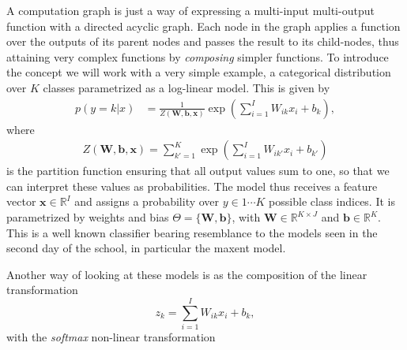 A computation graph is just a way of expressing a multi-input multi-output
function with a directed acyclic graph. Each node in the graph applies a
function over the outputs of its parent nodes and passes the result to its child-nodes,
thus attaining very complex functions by \textit{composing} simpler functions.
To introduce the concept we will work with a very simple example, a categorical
distribution over $K$ classes parametrized as a log-linear model. This is given
by
%
\begin{align}
p(y=k|{x}) & = \frac{1}{Z(\mathbf{W},\mathbf{b},\mathbf{x})}\exp\left(\sum_{i=1}^{I} W_{ik} x_i + b_k\right),
\label{eq:loglineargen}
\end{align}
%
\noindent where 
\begin{align}
Z(\mathbf{W},\mathbf{b},\mathbf{x}) = \sum_{k'=1}^{K} \exp\left(\sum_{i=1}^{I} W_{ik'} x_i + b_{k'}\right)
\label{eq:loglineargenPartition}
\end{align}
%
is the partition function ensuring that all output values sum to one, so that we can interpret
these values as probabilities. The model thus receives a feature vector
$\mathbf{x} \in \mathbb{R}^{I}$ and assigns a probability over $y \in {1 \cdots K}$ possible
class indices. It is parametrized by weights and bias $\Theta=\{\mathbf{W},
\mathbf{b}\}$, with $\mathbf{W} \in \mathbb{R}^{K \times J}$ and $\mathbf{b}
\in \mathbb{R}^{K}$. This is a well known classifier bearing resemblance to the
models seen in the second day of the school, in
particular the maxent model\footnotemark{}. 

Another way of looking at these models is as the composition of the linear transformation 
%
\begin{equation}
    z_k = \sum_{i=1}^{I} W_{ik} x_i + b_k,
\label{eq:linear}
\end{equation}
%
with the \textit{softmax} non-linear transformation

